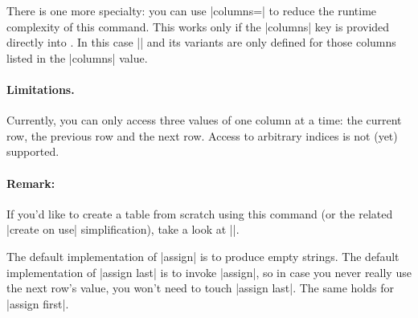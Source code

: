 \begin{command}{\pgfplotstablecreatecol{}}
\begin{codeexample}[pre={\begin{lateximage}},post={\end{lateximage}}]
\pgfplotstabletypeset[
    column type=l,
    columns={level,new},
    columns/new/.style={string type}
]\loadedtable
\end{codeexample}

    There is one more specialty: you can use |columns=| to
    reduce the runtime complexity of this command. This works only if the
    |columns| key is provided directly into . In this case
    |\thisrow| and its variants are only defined for those columns listed in
    the |columns| value.


    \paragraph{Limitations.}

    Currently, you can only access three values of one column at a time: the
    current row, the previous row and the next row. Access to arbitrary indices
    is not (yet) supported.


    \paragraph{Remark:}

    If you'd like to create a table from scratch using this command (or the
    related |create on use| simplification), take a look at
    |\pgfplotstablenew|.

    The default implementation of |assign| is to produce empty strings. The
    default implementation of |assign last| is to invoke |assign|, so in case
    you never really use the next row's value, you won't need to touch
    |assign last|. The same holds for |assign first|.
\end{command}

